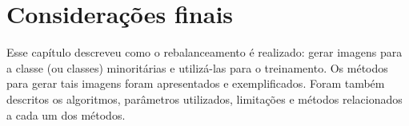 %
%
%
%
%


\section{Considerações finais}

Esse capítulo descreveu como o rebalanceamento é realizado: gerar imagens para a classe (ou classes) minoritárias e utilizá-las para o treinamento. Os métodos para gerar tais imagens foram apresentados e exemplificados. Foram também descritos os algoritmos, parâmetros utilizados, limitações e métodos relacionados a cada um dos métodos.

